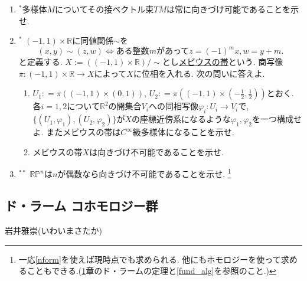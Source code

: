 \documentclass[dvipdfmx,a4paper,11pt]{article}
\newcommand{\R}{\mathbb{R}}
\theoremstyle{definition}
\begin{document}
\begin{enumerate}[label=\textbf{問}\ref*{sec-stokes}.\arabic*]
\item $^{*}$多様体$M$についてその接ベクトル束$TM$は常に向きづけ可能であることを示せ. 

\item $^{*}$ %
$(-1,1) \times \R$に同値関係$\sim$を
	$$
	(x,y) \sim (z,w)\Leftrightarrow \text{ある整数$m$があって}z = (-1)^m x, w = y+m.
	$$
	と定義する. $X := ((-1,1) \times \R) / \sim$とし\underline{メビウスの帯}という. 商写像$\pi : (-1,1) \times \R \rightarrow X$によって$X$に位相を入れる. 次の問いに答えよ.
	\begin{enumerate}
	 \setlength{\parskip}{0cm}
  \setlength{\itemsep}{2pt} 
  \item $U_1: = \pi( (-1,1) \times (0,1) ) $,  $U_2: = \pi( (-1,1) \times (-\frac{1}{2},\frac{1}{2}) )$とおく. 
各$i=1,2$について$\R^2$の開集合$V_i$への同相写像$\varphi_i : U_i \rightarrow V_i$で, $\{ (U_1, \varphi_1), (U_2, \varphi_2)\}$が$X$の座標近傍系になるような$\varphi_1, \varphi_2$を一つ構成せよ. またメビウスの帯は$C^{\infty}$級多様体になることを示せ.
  \item メビウスの帯$X$は向きづけ不可能であることを示せ.
	\end{enumerate}

\item $^{**}$ $\R \mathbb{P}^n$は$n$が偶数なら向きづけ不可能であることを示せ. \footnote{一応\ref{nform}を使えば現時点でも求められる. 他にもホモロジーを使って求めることもできる.(\ref{sec-deRham}章のド・ラームの定理と\ref{fund_alg}を参照のこと.)}


\end{enumerate}


\newpage


\begin{center}
\section{ド・ラーム コホモロジー群}
\label{sec-deRham}
\end{center}
\begin{flushright}
 岩井雅崇(いわいまさたか)
\end{flushright}
\end{document}
